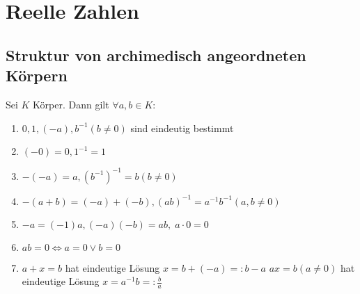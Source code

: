 \section{Reelle Zahlen}
\subsection*{Struktur von archimedisch angeordneten Körpern}
\begin{proposition}
	Sei $K$ Körper. Dann gilt $\forall a,b\in K$:
	\begin{enumerate}[label={\arabic*)}]
		\item $0,1,(-a),b^{-1} (b\neq 0)$ sind eindeutig bestimmt
		\item $(-0) = 0, 1^{-1} = 1$
		\item $-(-a) = a, (b^{-1})^{-1} = b (b\neq 0)$
		\item $-(a+b) = (-a) + (-b), (ab)^{-1} = a^{-1}b^{-1} (a,b\neq 0)$
		\item $-a = (-1) a, (-a)(-b) = ab,\;a\cdot 0 = 0$
		\item $ab = 0 \Leftrightarrow a=0\lor b = 0$
		\item $a+x = b$ hat eindeutige Lösung $x = b+(-a) =: b-a$ 
		$ax=b (a\neq 0)$ hat eindeutige Lösung $x=a^{-1}b =:\frac{b}{a}$ 
	\end{enumerate}
\end{proposition}

